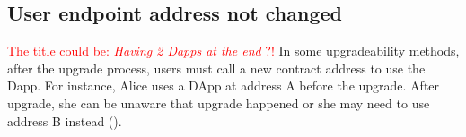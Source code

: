 
 



\subsection{User endpoint address not changed}
\textcolor{red}{The title could be: \textit{Having 2 Dapps at the end} ?!}
In some upgradeability methods, after the upgrade process, users must call a new contract address to use the Dapp. For instance, Alice uses a DApp at address A before the upgrade. After upgrade, she can be unaware that upgrade happened or she may need to use address B instead (\checkmark).

